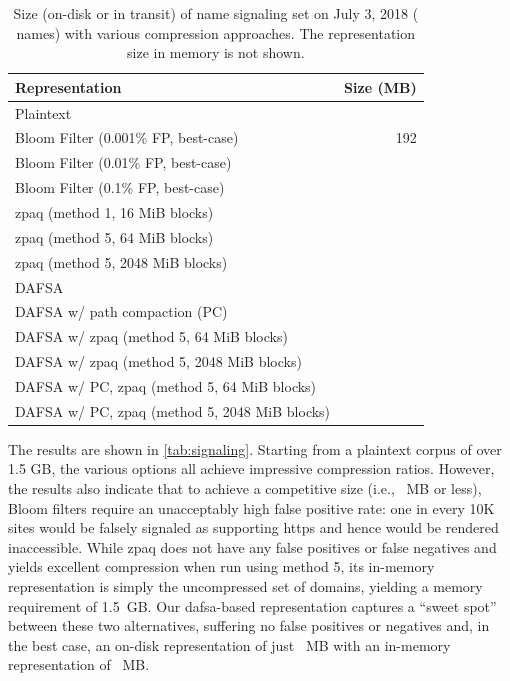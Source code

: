 

\begin{table}[tbp]
  \small
  \centering
  \caption{Size (on-disk or in transit) of \ac{name} signaling set on
    July 3, 2018 (\numnames{} names) with various compression approaches. The
    representation size in memory is not shown.}
  \vspace{-2mm}
  \begin{tabular}{|lr|}
    \toprule
    \textbf{Representation} & \textbf{Size (MB)} \\
    \midrule
    Plaintext & \plaintextsize \\
    \midrule
    Bloom Filter (0.001\% FP, best-case) & 192 \\
    Bloom Filter (0.01\% FP, best-case) & \bloomlargesize \\
    Bloom Filter (0.1\% FP, best-case) & \bloommedsize \\
    \midrule
    zpaq (method 1, 16 MiB blocks) & \zpaqlargesize \\
    zpaq (method 5, 64 MiB blocks) & \zpaqmedsize \\
    zpaq (method 5, 2048 MiB blocks) & \zpaqsmallsize \\
    \midrule
    DAFSA & \fsalargesize \\
    DAFSA w/ path compaction (PC) & \fsamedsize \\
    DAFSA w/ zpaq (method 5, 64 MiB blocks) & \fsazpaqlargesize \\
    DAFSA w/ zpaq (method 5, 2048 MiB blocks) & \fsazpaqmedsize \\
    DAFSA w/ PC, zpaq (method 5, 64 MiB blocks) & \fsapczpaqlargesize \\
    DAFSA w/ PC, zpaq (method 5, 2048 MiB blocks) & \fsapczpaqmedsize \\
    \bottomrule
  \end{tabular}
  \vspace{-4mm}
  \label{tab:signaling}
\end{table}

The results are shown in \autoref{tab:signaling}. Starting from a plaintext
corpus of over 1.5 GB, the various options all achieve impressive compression
ratios. However, the results also indicate that to achieve a competitive size
(i.e., \bloomlargesize{}~MB or less), Bloom filters require an
unacceptably high false positive rate: one in every 10K sites would be falsely
signaled as supporting \ac{https} and hence would be rendered inaccessible.
While zpaq does not have any false positives or false negatives and yields
excellent compression when run using method 5, its in-memory representation is
simply the uncompressed set of domains, yielding a memory requirement of 1.5~GB.
Our \ac{dafsa}-based representation captures a ``sweet spot'' between these two
alternatives, suffering no false positives or negatives and, in the best case,
an on-disk representation of just \fsapczpaqmedsize{}~MB with an in-memory
representation of \fsamedsize{}~MB.

